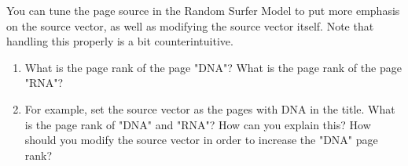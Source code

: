 \documentclass[mathserif, 11pt,c]{article}
\begin{document}
You can tune the page source in the Random Surfer Model to put more emphasis on the source vector, as well as modifying the source vector itself.
Note that handling this properly is a bit counterintuitive.

\begin{enumerate}[label=\textbf{Q\thesection.\arabic*}]
	\item What is the page rank of the page "DNA"? What is the page rank of the page "RNA"?
	\item For example, set the source vector as the pages with DNA in the title. What is the page rank of "DNA" and "RNA"? How can you explain this? How should you modify the source vector in order to increase the "DNA" page rank?
\end{enumerate}
	

%
\end{document}
